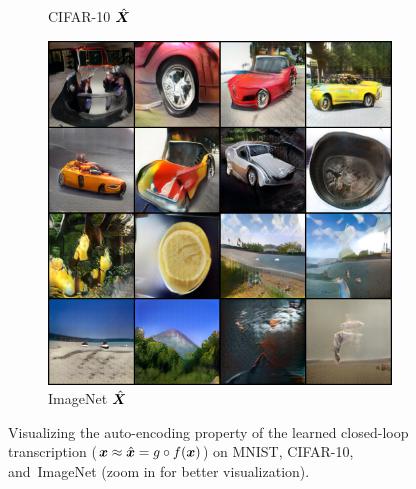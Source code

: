 \documentclass[../../book-main.tex]{subfiles}
\begin{document}
\begin{figure}[t]
\begin{subfigure}[t]{0.3\textwidth}
        \caption{{\small CIFAR-10 $\hat{\bm{X}}$}}
    \end{subfigure}
    \hfill
    \begin{subfigure}[t]{0.3\textwidth}
        \centering
        \includegraphics[width=\textwidth]{chapters/chapter5/figs/Imagenet_reconstruct.png}
        \caption{{\small ImageNet $\hat{\bm{X}}$}}
    \end{subfigure}
    \caption{Visualizing the auto-encoding property of the learned closed-loop transcription \mbox{($\bm{x} \approx \hat{\bm{x}} = g\circ f(\bm{x})$)} on MNIST, CIFAR-10, and~ImageNet (zoom in for better visualization).}
    \label{fig:justifyxhatequalsx}
\end{figure}
     
\end{document}
